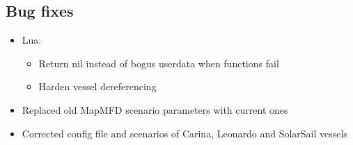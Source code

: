 \documentclass[Orbiter User Manual.tex]{subfiles}
\begin{document}
\subsection{Bug fixes}

\begin{itemize}
	\item Lua:
	\begin{itemize}
		\item Return nil instead of bogus userdata when functions fail
		\item Harden vessel dereferencing
	\end{itemize}
	\item Replaced old MapMFD scenario parameters with current ones
	\item Corrected config file and scenarios of Carina, Leonardo and SolarSail vessels
\end{itemize}
\end{document}
